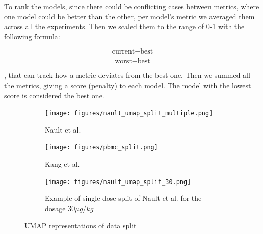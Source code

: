 \documentclass[12pt, a4paper]{article}
\begin{document}
To rank the models, since there could be conflicting cases between metrics, where one model could be better than the other, per model's metric we averaged them across all the experiments. Then we scaled them to the range of 0-1 with the following formula:

\[\frac{\text{current} - \text{best}}{\text{worst} - \text{best}}\]


, that can track how a metric deviates from the best one. Then we summed all the metrics, giving a score (penalty) to each model. The model with the lowest score is considered the best one.

\begin{figure}[h!]
    \centering
    \begin{subfigure}[t]{0.48\textwidth}
        \centering
        \texttt{[image: figures/nault\_umap\_split\_multiple.png]}
        \caption{Nault et al. \cite{nault2021single,nault2022benchmarking}}
        \label{fig:nault_umap}
    \end{subfigure}
    \hfill
    \begin{subfigure}[t]{0.48\textwidth}
        \centering
        \texttt{[image: figures/pbmc\_split.png]}
        \caption{Kang et al. \cite{kanaGenerativeModelingSinglecell2023}}
        \label{fig:pbmc_umap}
    \end{subfigure}
    \begin{subfigure}[b]{0.48\textwidth}
        \centering
        \texttt{[image: figures/nault\_umap\_split\_30.png]}
        \caption{Example of single dose split of Nault et al. \cite{kanaGenerativeModelingSinglecell2023} for the dosage $30 \mu g/kg$}
        \label{fig:pbmc_umap}
    \end{subfigure}    
    \caption{UMAP representations of data split}
    \label{fig:umap_side_by_side}
\end{figure}


\end{document}
